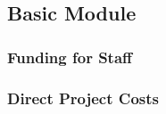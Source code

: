 \documentclass{scrartcl}
\begin{document}
\subsection{Basic Module}

\subsubsection{Funding for Staff}
\label{sec:staff}



\subsubsection{Direct Project Costs}



\label{sec:costs:travel}

\end{document}
